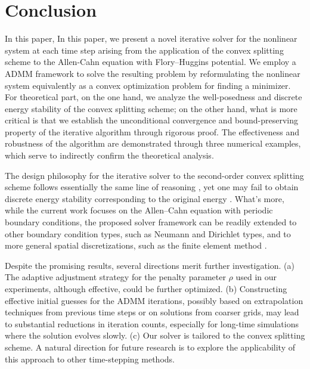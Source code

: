 \section{Conclusion}
\label{section:conclusion}
In this paper, In this paper, we present a novel iterative solver for the nonlinear system at each time step arising from the application of the convex splitting scheme to the Allen-Cahn equation with Flory–Huggins potential. 
We employ a ADMM framework to solve the resulting problem 
by reformulating the nonlinear system equivalently as a convex optimization problem for finding a minimizer. 
For theoretical part, on the one hand, we analyze the well-posedness and discrete energy stability of the convex splitting scheme; 
on the other hand, what is more critical is that we establish the unconditional convergence and bound-preserving property of the iterative algorithm through rigorous proof.
The effectiveness and robustness of the algorithm are demonstrated through three numerical examples, 
which serve to indirectly confirm the theoretical analysis.
\par The design philosophy for the iterative solver to the second-order convex splitting scheme follows essentially the same line of reasoning \cite{li2025overcoming}, 
yet one may fail to obtain discrete energy stability corresponding to the original energy \cite{gomez2011provably,yang2016linear}. 
What's more, while the current work focuses on the Allen–Cahn equation with periodic boundary conditions, 
the proposed solver framework can be readily extended to other boundary condition types, such as Neumann and Dirichlet types, 
and to more general spatial discretizations, such as the finite element method \cite{yuan2022second}.
\par Despite the promising results, several directions merit further investigation. 
(a) The adaptive adjustment strategy for the penalty parameter $\rho$
used in our experiments, although effective, could be further optimized.
(b) Constructing effective initial guesses for the ADMM iterations, 
possibly based on extrapolation techniques from previous time steps or on solutions from coarser grids, 
may lead to substantial reductions in iteration counts, especially for long-time simulations where the solution evolves slowly.
(c) Our solver is tailored to the convex splitting scheme. 
A natural direction for future research is to explore the applicability of this approach to other time-stepping methods.
